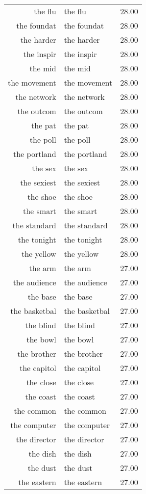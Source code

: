 \begin{table}[ht]
\begin{tabular}{rlr}
  the flu & the flu & 28.00 \\ 
  the foundat & the foundat & 28.00 \\ 
  the harder & the harder & 28.00 \\ 
  the inspir & the inspir & 28.00 \\ 
  the mid & the mid & 28.00 \\ 
  the movement & the movement & 28.00 \\ 
  the network & the network & 28.00 \\ 
  the outcom & the outcom & 28.00 \\ 
  the pat & the pat & 28.00 \\ 
  the poll & the poll & 28.00 \\ 
  the portland & the portland & 28.00 \\ 
  the sex & the sex & 28.00 \\ 
  the sexiest & the sexiest & 28.00 \\ 
  the shoe & the shoe & 28.00 \\ 
  the smart & the smart & 28.00 \\ 
  the standard & the standard & 28.00 \\ 
  the tonight & the tonight & 28.00 \\ 
  the yellow & the yellow & 28.00 \\ 
  the arm & the arm & 27.00 \\ 
  the audience & the audience & 27.00 \\ 
  the base & the base & 27.00 \\ 
  the basketbal & the basketbal & 27.00 \\ 
  the blind & the blind & 27.00 \\ 
  the bowl & the bowl & 27.00 \\ 
  the brother & the brother & 27.00 \\ 
  the capitol & the capitol & 27.00 \\ 
  the close & the close & 27.00 \\ 
  the coast & the coast & 27.00 \\ 
  the common & the common & 27.00 \\ 
  the computer & the computer & 27.00 \\ 
  the director & the director & 27.00 \\ 
  the dish & the dish & 27.00 \\ 
  the dust & the dust & 27.00 \\ 
  the eastern & the eastern & 27.00 \\ 

\end{tabular}
\end{table}
